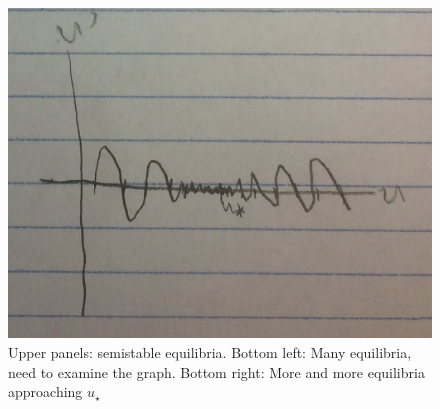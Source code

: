 \documentclass[main.tex]{subfiles}
\begin{document}
\begin{figure}
\begin{multicols}{2}
    \includegraphics[width=\linewidth]{infinite-equilibria}\par
\end{multicols}
\caption{Upper panels: semistable equilibria.
Bottom left: Many equilibria, need to examine the graph.
Bottom right: More and more equilibria approaching $u_\star$}
\end{figure}

%
%
%
%
%
%
\end{document}

